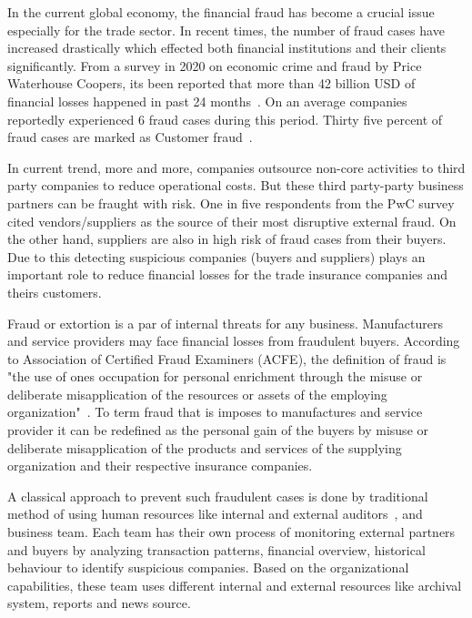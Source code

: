 
In the current global economy, the financial fraud has become a crucial issue especially for the trade sector. In recent times, the number of fraud cases have increased drastically which effected both financial institutions and their clients significantly. From a survey in 2020 on economic crime and fraud by Price Waterhouse Coopers, its been reported that more than 42 billion USD of financial losses happened in past 24 months~\cite{PwC.Crime.Survey}. On an average companies reportedly experienced 6 fraud cases during this period. Thirty five percent of fraud cases are marked as Customer fraud~\cite{PwC.Crime.Survey}.   

In current trend, more and more, companies outsource non-core activities to third party companies to reduce operational costs. But these third party-party business partners can be fraught with risk. One in five respondents from the PwC survey~\cite{PwC.Crime.Survey} cited vendors/suppliers as the source of their most disruptive external fraud. On the other hand, suppliers are also in high risk of fraud cases from their buyers. Due to this detecting suspicious companies (buyers and suppliers) plays an important role to reduce financial losses for the trade insurance companies and theirs customers.


Fraud or extortion is a par of internal threats for any business. Manufacturers and service providers may face financial losses from fraudulent buyers. According to Association of Certified Fraud Examiners (ACFE), the definition of fraud is "the use of one\’s occupation for personal enrichment through the misuse or deliberate
misapplication of the resources or assets of the employing organization"~\cite{kassem_2014}. To term fraud that is imposes to manufactures and service provider it can be redefined as the personal gain of the buyers by misuse or deliberate misapplication of the products and services of the supplying organization and their respective insurance companies.


A classical approach to prevent such fraudulent cases is done by traditional method of using human resources like internal and external auditors~\cite{kassem_2014}, and business team. Each team has their own process of monitoring external partners and buyers by analyzing transaction patterns, financial overview, historical behaviour to identify suspicious companies.  Based on the organizational capabilities, these team uses different internal and external resources like archival system, reports and news source.


